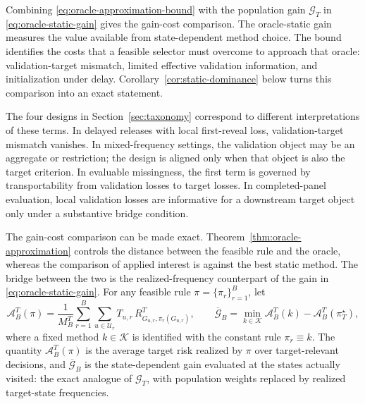 \documentclass[a4paper, 12pt]{article}
\theoremstyle{plain}
\theoremstyle{remark}
\newcommand{\Kcal}{\mathcal{K}}
\newcommand{\Ucal}{\mathcal{U}}
\newcommand{\1}{\mathbf{1}}
\begin{document}
Combining \eqref{eq:oracle-approximation-bound} with the population gain \(\mathcal G_T\) in \eqref{eq:oracle-static-gain} gives the gain-cost comparison. The oracle-static gain measures the value available from state-dependent method choice. The bound identifies the costs that a feasible selector must overcome to approach that oracle: validation-target mismatch, limited effective validation information, and initialization under delay. Corollary~\ref{cor:static-dominance} below turns this comparison into an exact statement.

The four designs in Section~\ref{sec:taxonomy} correspond to different interpretations of these terms. In delayed releases with local first-reveal loss, validation-target mismatch vanishes. In mixed-frequency settings, the validation object may be an aggregate or restriction; the design is aligned only when that object is also the target criterion. In evaluable missingness, the first term is governed by transportability from validation losses to target losses. In completed-panel evaluation, local validation losses are informative for a downstream target object only under a substantive bridge condition.

The gain-cost comparison can be made exact. Theorem~\ref{thm:oracle-approximation} controls the distance between the feasible rule and the oracle, whereas the comparison of applied interest is against the best static method. The bridge between the two is the realized-frequency counterpart of the gain in \eqref{eq:oracle-static-gain}. For any feasible rule \(\pi=\{\pi_r\}_{r=1}^B\), let
\begin{equation}
\label{eq:realized-risk-and-gain}
\mathcal A^T_B(\pi)
=\frac{1}{M^T_B}\sum_{r=1}^{B}\sum_{u\in\Ucal_r}T_{u,r}\,R^T_{G_{u,r},\pi_r(G_{u,r})},
\qquad
\overline{\mathcal G}_B
=\min_{k\in\Kcal}\mathcal A^T_B(k)-\mathcal A^T_B(\pi^\star_T),
\end{equation}
where a fixed method \(k\in\Kcal\) is identified with the constant rule \(\pi_r\equiv k\). The quantity \(\mathcal A^T_B(\pi)\) is the average target risk realized by \(\pi\) over target-relevant decisions, and \(\overline{\mathcal G}_B\) is the state-dependent gain evaluated at the states actually visited: the exact analogue of \(\mathcal G_T\), with population weights replaced by realized target-state frequencies.
\end{document}
